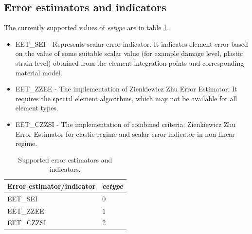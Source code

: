 \documentclass[a4paper]{article}
\newcommand{\param}[1]{{\em #1}}
\begin{document}
\subsection{Error estimators and indicators}
\label{errorestimators}
The currently supported values of \param{eetype} are in table
\ref{eetypestable}.
\begin{itemize}
\item
EET\_SEI - Represents scalar error indicator.
It indicates element error based on the value of some suitable scalar
value (for example damage level, plastic strain level) obtained from the
element integration points and corresponding material model.
\item
EET\_ZZEE - The implementation of Zienkiewicz Zhu Error
Estimator. It requires the special element algorithms, which may not
be available for all element types.
\item
EET\_CZZSI - The implementation of combined criteria: Zienkiewicz Zhu Error Estimator for elastic regime and
scalar error indicator in non-linear regime.
\end{itemize}

\begin{table}[h]
\begin{center}
\begin{tabular}{|l|l|}
\hline
Error estimator/indicator & \param{eetype}\\
\hline
EET\_SEI & 0 \\
EET\_ZZEE& 1 \\
EET\_CZZSI& 2\\
\hline
\end{tabular}
\caption{Supported error estimators and indicators.}
\label{eetypestable}
\end{center}
\end{table}
\end{document}
